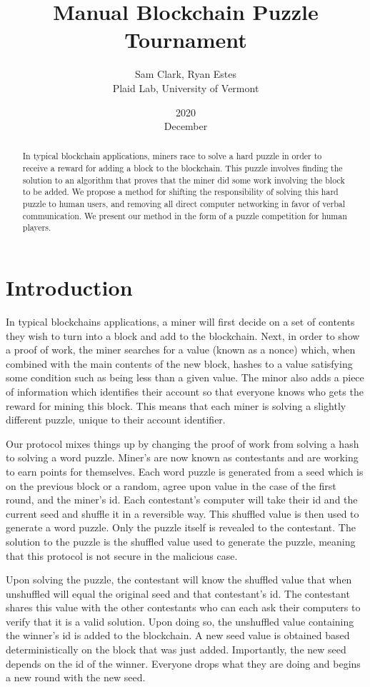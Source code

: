 \documentclass[leqno,12pt]{article}
\title{Manual Blockchain Puzzle Tournament}
\date{2020\\ December}
\author{Sam Clark, Ryan Estes\\ Plaid Lab, University of Vermont}
\begin{document}
\maketitle

\begin{abstract}
  In typical blockchain applications, miners race to solve a hard puzzle in order to receive a reward for adding a block to the blockchain. This puzzle involves finding the solution to an algorithm that proves that the miner did some work involving the block to be added. We propose a method for shifting the responsibility of solving this hard puzzle to human users, and removing all direct computer networking in favor of verbal communication. We present our method in the form of a puzzle competition for human players.
\end{abstract}
  
\section{Introduction}

In typical blockchains applications, a miner will first decide on a set of contents they wish to turn into a block and add to the blockchain. Next, in order to show a proof of work, the miner searches for a value (known as a nonce) which, when combined with the main contents of the new block, hashes to a value satisfying some condition such as being less than a given value. The minor also adds a piece of information which identifies their account so that everyone knows who gets the reward for mining this block.\cite{block} This means that each miner is solving a slightly different puzzle, unique to their account identifier.

Our protocol mixes things up by changing the proof of work from solving a hash to solving a word puzzle. Miner's are now known as contestants and are working to earn points for themselves. Each word puzzle is generated from a seed which is on the previous block or a random, agree upon value in the case of the first round, and the miner's id. Each contestant's computer will take their id and the current seed and shuffle it in a reversible way. This shuffled value is then used to generate a word puzzle. Only the puzzle itself is revealed to the contestant. The solution to the puzzle is the shuffled value used to generate the puzzle, meaning that this protocol is not secure in the malicious case.

Upon solving the puzzle, the contestant will know the shuffled value that when unshuffled will equal the original seed and that contestant's id. The contestant shares this value with the other contestants who can each ask their computers to verify that it is a valid solution. Upon doing so, the unshuffled value containing the winner's id is added to the blockchain. A new seed value is obtained based deterministically on the block that was just added. Importantly, the new seed depends on the id of the winner. Everyone drops what they are doing and begins a new round with the new seed.
\end{document}
